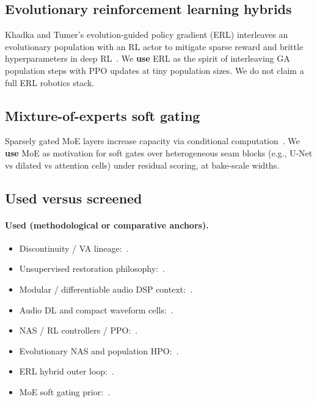 \subsection{Evolutionary reinforcement learning hybrids}
Khadka and Tumer's evolution-guided policy gradient (ERL) interleaves an evolutionary population with an RL actor to mitigate sparse reward and brittle hyperparameters in deep RL~\cite{khadka2018}.
We \textbf{use} ERL as the spirit of interleaving GA population steps with PPO updates at tiny population sizes.
We do not claim a full ERL robotics stack.

\subsection{Mixture-of-experts soft gating}
Sparsely gated MoE layers increase capacity via conditional computation~\cite{shazeer2017}.
We \textbf{use} MoE as motivation for soft gates over heterogeneous seam blocks (e.g., U-Net vs dilated vs attention cells) under residual scoring, at bake-scale widths.

\subsection{Used versus screened}
\label{sec:used-screened}

\paragraph{Used (methodological or comparative anchors).}
\begin{itemize}
  \item Discontinuity / VA lineage:~\cite{stilson1996,esqueda2016blamp,nam2009polyblep}.
  \item Unsupervised restoration philosophy:~\cite{lehtinen2018,kashyap2021n2n,wisdom2020}.
  \item Modular / differentiable audio DSP context:~\cite{engel2020}.
  \item Audio DL and compact waveform cells:~\cite{purwins2019,stoller2018,macartney2018,jansson2017,luo2019,luo2020dprnn,subakan2021,gong2021ast,ronneberger2015,he2016resnet,vaswani2017}.
  \item NAS / RL controllers / PPO:~\cite{elsken2019,zoph2017nas,pham2018,schulman2017,tan2019mnasnet,liu2018pnas}.
  \item Evolutionary NAS and population HPO:~\cite{real2017large,real2019,jaderberg2017,snoek2012,hansen2016cmaes}.
  \item ERL hybrid outer loop:~\cite{khadka2018}.
  \item MoE soft gating prior:~\cite{shazeer2017}.
\end{itemize}

